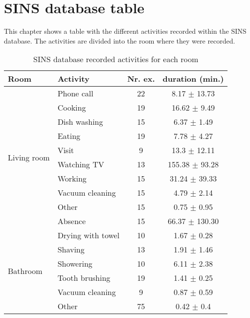 \chapter{SINS database table}
\label{app:SINS-Database-Table}
This chapter shows a table with the different activities recorded within the SINS database. The activities are divided into the room where they were recorded.

\begin{table}[htbp]
    \centering
    \caption[SINS database recorded activities for each room]{SINS database recorded activities for each room \footnotemark}
	\label{tab:sins-database-recorded-activities}
    \begin{tabular}{l|l|c|c}
        \toprule
        \textbf{Room} & \textbf{Activity} & \textbf{Nr. ex.} & \textbf{duration (min.)} \\ 
        \midrule[1pt]
        \multirow{10}{*}{Living room} & Phone call & 22 & 8.17 $\pm$ 13.73 \\
        \cline{2-4}
        & Cooking & 19 & 16.62 $\pm$ 9.49 \\
        \cline{2-4}
        & Dish washing & 15 & 6.37 $\pm$ 1.49 \\
        \cline{2-4}
        & Eating & 19 & 7.78 $\pm$ 4.27 \\
        \cline{2-4}
        & Visit & 9 & 13.3 $\pm$ 12.11 \\
        \cline{2-4}
        & Watching TV & 13 & 155.38 $\pm$ 93.28 \\
        \cline{2-4}
        & Working & 15 & 31.24 $\pm$ 39.33 \\
        \cline{2-4}
        & Vacuum cleaning & 15 & 4.79 $\pm$ 2.14 \\
        \cline{2-4}
        & Other & 15 & 0.75 $\pm$ 0.95 \\
        \cline{2-4}
        & Absence & 15 & 66.37 $\pm$ 130.30 \\
        \midrule[1pt]
        \multirow{7}{*}{Bathroom} & Drying with towel & 10 & 1.67 $\pm$ 0.28 \\
        \cline{2-4}
        & Shaving & 13 & 1.91 $\pm$ 1.46 \\
        \cline{2-4}
        & Showering & 10 & 6.11 $\pm$ 2.38 \\
        \cline{2-4}
        & Tooth brushing & 19 & 1.41 $\pm$ 0.25 \\
        \cline{2-4}
        & Vacuum cleaning & 9 & 0.87 $\pm$ 0.59 \\
        \cline{2-4}
        & Other & 75 & 0.42 $\pm$ 0.4 \\

\end{tabular}
\end{table}
